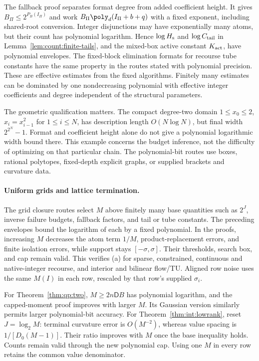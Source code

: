 The fallback proof separates format degree from added coefficient height.
It gives $B_\Pi\le2^{P_B(I_\Pi)}$ and work
$B_\Pi\poly_d(I_\Pi+b+q)$ with a fixed exponent, including shared-root
conversion. Integer disjunctions may have exponentially many atoms, but
their count has polynomial logarithm. Hence $\log H_{\rm s}$ and
$\log C_{\rm tail}$ in Lemma~\ref{lem:count:finite-tails}, and the
mixed-box active constant $K_{\rm act}$, have polynomial envelopes.
The fixed-block elimination formats for recourse tube constants have the
same property in the routes stated with polynomial precision. These are
effective estimates from the fixed algorithms. Finitely many estimates
can be dominated by one nondecreasing polynomial with effective integer
coefficients and degree independent of the structural parameters.

The geometric qualification matters. The compact degree-two domain
$1\le x_0\le2$, $x_i=x_{i-1}^2$ for $1\le i\le N$, has description
length $O(N\log N)$, but final width $2^{2^N}-1$. Format and coefficient
height alone do not give a polynomial logarithmic width bound there.
This example concerns the budget inference, not the difficulty of
optimizing on that particular chain. The polynomial-bit routes use boxes,
rational polytopes, fixed-depth explicit graphs, or supplied brackets
and curvature data.

\paragraph{Uniform grids and lattice termination.}
The grid closure routes select $M$ above finitely many base quantities
such as $2^J$, inverse failure budgets, fallback factors, and tail or
tube constants. The preceding envelopes bound the logarithm of each by
a fixed polynomial. In the proofs, increasing $M$ decreases the atom
term $1/M$, product-replacement errors, and finite isolation errors,
while support stays $[-\sigma,\sigma]$. Their thresholds, search box,
and cap remain valid. This verifies (a) for sparse, constrained,
continuous and native-integer recourse, and interior and bilinear
flow/TU. Aligned row noise uses the same $M(I)$ in each row, rescaled
by that row's supplied $\sigma_i$.

For Theorem~\ref{thm:qp:two}, $M\ge2n\mathsf DB$ has polynomial
logarithm, and the capped-moment proof improves with larger $M$.
Its Gaussian version similarly permits larger polynomial-bit accuracy.
For Theorem~\ref{thm:int:lowrank}, reset $J=\log_2M$: terminal curvature
error is $O(M^{-2})$, whereas value spacing is $1/[D_0(M-1)]$.
Their ratio improves with $M$ once the base inequality holds. Counts
remain valid through the new polynomial cap. Using one $M$ in every
row retains the common value denominator.

